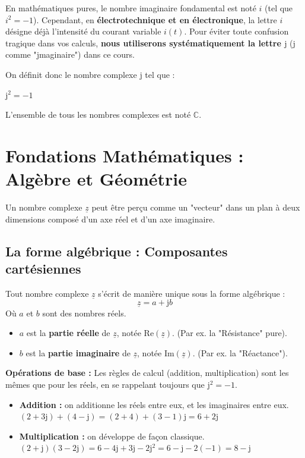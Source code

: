 \documentclass[11pt,a4paper]{article}
\newcommand{\jc}{\mathrm{j}} %
\newcommand{\cpx}[1]{\underline{#1}} %
\begin{document}
\begin{attention}
En mathématiques pures, le nombre imaginaire fondamental est noté $i$ (tel que $i^2 = -1$). Cependant, en \textbf{électrotechnique et en électronique}, la lettre $i$ désigne déjà l'intensité du courant variable $i(t)$. Pour éviter toute confusion tragique dans vos calculs, \textbf{nous utiliserons systématiquement la lettre $\jc$} (j comme "jmaginaire") dans ce cours.
\end{attention}

On définit donc le nombre complexe $\jc$ tel que :
\begin{center}
    \Large $\jc^2 = -1$
\end{center}
L'ensemble de tous les nombres complexes est noté $\mathbb{C}$.

\section{Fondations Mathématiques : Algèbre et Géométrie}

Un nombre complexe $\cpx{z}$ peut être perçu comme un "vecteur" dans un plan à deux dimensions composé d'un axe réel et d'un axe imaginaire.

\subsection{La forme algébrique : Composantes cartésiennes}
\begin{vocabulaire}
Tout nombre complexe $\cpx{z}$ s'écrit de manière unique sous la forme algébrique :
$$\cpx{z} = a + \jc b$$
Où $a$ et $b$ sont des nombres réels.
\begin{itemize}
    \item $a$ est la \textbf{partie réelle} de $\cpx{z}$, notée $\text{Re}(\cpx{z})$. (Par ex. la "Résistance" pure).
    \item $b$ est la \textbf{partie imaginaire} de $\cpx{z}$, notée $\text{Im}(\cpx{z})$. (Par ex. la "Réactance").
\end{itemize}
\end{vocabulaire}

\textbf{Opérations de base :} Les règles de calcul (addition, multiplication) sont les mêmes que pour les réels, en se rappelant toujours que $\jc^2 = -1$.
\begin{itemize}
    \item \textbf{Addition :} on additionne les réels entre eux, et les imaginaires entre eux. \\
    $(2 + 3\jc) + (4 - \jc) = (2+4) + (3-1)\jc = 6 + 2\jc$
    \item \textbf{Multiplication :} on développe de façon classique. \\
    $(2 + \jc)(3 - 2\jc) = 6 - 4\jc + 3\jc - 2\jc^2 = 6 - \jc - 2(-1) = 8 - \jc$
\end{itemize}
\end{document}
